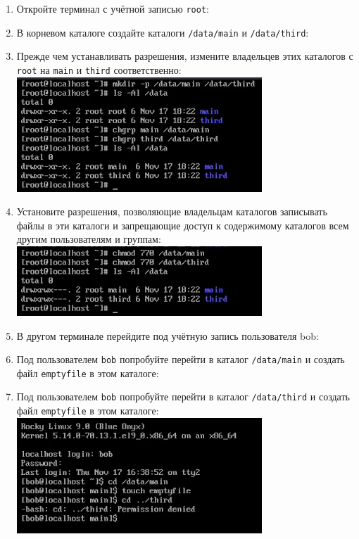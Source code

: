 \documentclass[12pt]{article}
\begin{document}
\begin{enumerate}
	\item Откройте терминал с учётной записью \texttt{root}:
	\item В корневом каталоге создайте каталоги \texttt{/data/main} и \texttt{/data/third}:
	\item Прежде чем устанавливать разрешения, измените владельцев этих каталогов с \texttt{root} на \texttt{main} и \texttt{third} соответственно:
	      \\\includegraphics{1.png}
	\item Установите разрешения, позволяющие владельцам каталогов записывать файлы в эти каталоги и запрещающие доступ к содержимому каталогов всем другим пользователям и группам:
	      \\\includegraphics{2.png}
	\item В другом терминале перейдите под учётную запись пользователя bob:
	\item Под пользователем \texttt{bob} попробуйте перейти в каталог \texttt{/data/main} и создать файл \texttt{emptyfile} в этом каталоге:
	\item Под пользователем \texttt{bob} попробуйте перейти в каталог \texttt{/data/third} и создать файл \texttt{emptyfile} в этом каталоге:
	      \\\includegraphics{3.png}
\end{enumerate}
\end{document}
